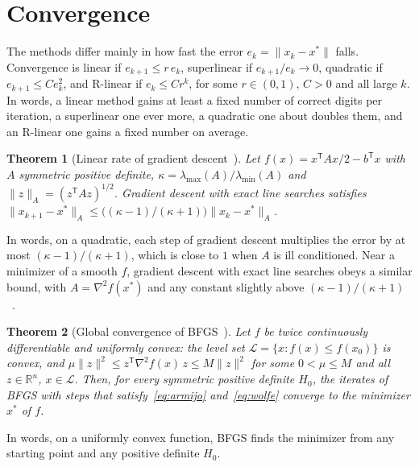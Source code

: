 \documentclass[11pt,a4paper]{amsart}
\numberwithin{equation}{section}
\theoremstyle{plain}
\newtheorem{theorem}{Theorem}[section]
\theoremstyle{definition}
\theoremstyle{remark}
\newcommand{\R}{\mathbb{R}}
\newcommand{\grad}{\nabla}
\newcommand{\T}{\mathsf{T}}
\newcommand{\norm}[1]{\lVert #1 \rVert}
\begin{document}
\section{Convergence}\label{sec:convergence}

The methods differ mainly in how fast the error $e_k = \norm{x_k - x^*}$
falls. Convergence is linear if $e_{k+1} \leq r\, e_k$, superlinear if
$e_{k+1}/e_k \to 0$, quadratic if $e_{k+1} \leq C e_k^2$, and R-linear
if $e_k \leq C r^k$, for some $r \in (0, 1)$, $C > 0$ and all large
$k$. In words, a linear method gains at least a fixed number of correct
digits per iteration, a superlinear one ever more, a quadratic one about
doubles them, and an R-linear one gains a fixed number on average.

\begin{theorem}[Linear rate of gradient descent~{\cite[\S3.3]{nocedal2006}}]\label{thm:sd}
Let $f(x) = x^\T A x / 2 - b^\T x$ with $A$ symmetric positive
definite, $\kappa = \lambda_{\max}(A) / \lambda_{\min}(A)$ and
$\norm{z}_A = (z^\T A z)^{1/2}$. Gradient descent with exact line
searches satisfies $\norm{x_{k+1} - x^*}_A \leq
\bigl((\kappa - 1)/(\kappa + 1)\bigr) \norm{x_k - x^*}_A$.
\end{theorem}

In words, on a quadratic, each step of gradient descent multiplies the
error by at most $(\kappa - 1)/(\kappa + 1)$, which is close to $1$
when $A$ is ill conditioned. Near a minimizer of a smooth $f$, gradient
descent with exact line searches obeys a similar bound, with
$A = \grad^2 f(x^*)$ and any constant slightly above
$(\kappa - 1)/(\kappa + 1)$~\cite[\S3.3]{nocedal2006}.

\begin{theorem}[Global convergence of BFGS~{\cite[Theorem~6.5]{nocedal2006}}]\label{thm:global}
Let $f$ be twice continuously differentiable and \emph{uniformly
convex}: the level set $\mathcal{L} = \{x : f(x) \leq f(x_0)\}$ is
convex, and $\mu \norm{z}^2 \leq z^\T \grad^2 f(x)\, z \leq M \norm{z}^2$
for some $0 < \mu \leq M$ and all $z \in \R^n$, $x \in \mathcal{L}$.
Then, for every symmetric positive definite $H_0$, the iterates of BFGS
with steps that satisfy~\eqref{eq:armijo} and~\eqref{eq:wolfe} converge
to the minimizer $x^*$ of $f$.
\end{theorem}

In words, on a uniformly convex function, BFGS finds the minimizer from
any starting point and any positive definite $H_0$.
\end{document}
